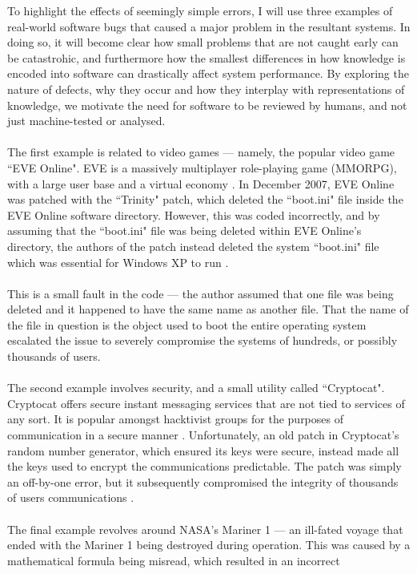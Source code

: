 To highlight the effects of seemingly simple errors, I will use three examples of real-world
software bugs that caused a major problem in the resultant systems.
In doing so, it will become clear how small problems that are not caught early can be catastrohic,
and furthermore how the smallest differences in how knowledge is encoded into software can
drastically affect system performance.
By exploring the nature of defects, why they occur and how they interplay with representations of
knowledge, we motivate the need for software to be reviewed by humans, and not just machine-tested
or analysed.\\
\\
The first example is related to video games --- namely, the popular video game ``EVE Online".
EVE is a massively multiplayer role-playing game (MMORPG), with a large user base and a virtual
economy \FIXME.
In December 2007, EVE Online was patched with the ``Trinity" patch, which deleted the ``boot.ini"
file inside the EVE Online software directory.
However, this was coded incorrectly, and by assuming that the ``boot.ini" file was being deleted
within EVE Online's directory, the authors of the patch instead deleted the system ``boot.ini" file
which was essential for Windows XP to run \FIXME.\\
\\
This is a small fault in the code --- the author assumed that one file was being deleted and it
happened to have the same name as another file.
That the name of the file in question is the object used to boot the entire operating system
escalated the issue to severely compromise the systems of hundreds, or possibly thousands of
users.\\
\\
The second example involves security, and a small utility called ``Cryptocat".
Cryptocat offers secure instant messaging services that are not tied to services of any sort.
It is popular amongst hacktivist groups for the purposes of communication in a secure manner \FIXME.
Unfortunately, an old patch in Cryptocat's random number generator, which ensured its keys were
secure, instead made all the keys used to encrypt the communications predictable.
The patch was simply an off-by-one error, but it subsequently compromised the integrity of thousands
of users communications \FIXME.\\
\\
The final example revolves around NASA's Mariner 1 --- an ill-fated voyage that ended with the
Mariner 1 being destroyed during operation.
This was caused by a mathematical formula being misread, which resulted in an incorrect

